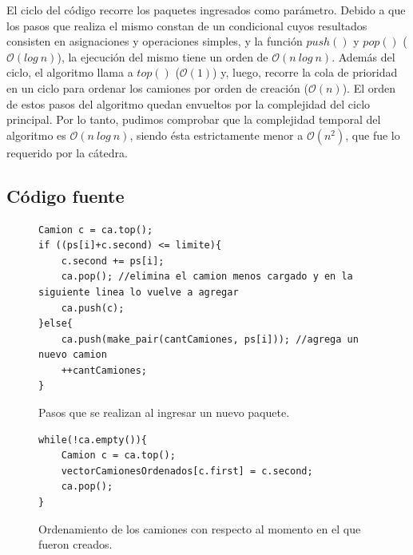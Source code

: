 \newline
El ciclo del código recorre los paquetes ingresados como parámetro. Debido a que los pasos que realiza el mismo constan de un condicional cuyos resultados consisten en asignaciones y operaciones simples, y la función $push()$ y $pop()$ ($\mathcal{O}(log\ n)$), la ejecución del mismo tiene un orden de $\mathcal{O}(n\ log\ n)$.\newline
\newline
Además del ciclo, el algoritmo llama a $top()$ ($\mathcal{O}(1)$\footnotemark[1]) y, luego, recorre la cola de prioridad en un ciclo para ordenar los camiones por orden de creación ($\mathcal{O}(n)$). El orden de estos pasos del algoritmo quedan envueltos por la complejidad del ciclo principal. Por lo tanto, pudimos comprobar que la complejidad temporal del algoritmo es $\mathcal{O}(n\ log\ n)$, siendo ésta estrictamente menor a $\mathcal{O}(n^2)$, que fue lo requerido por la cátedra.

\subsection{Código fuente}

\begin{figure}[H]
\begin{center}
\begin{verbatim}
Camion c = ca.top();
if ((ps[i]+c.second) <= limite){
    c.second += ps[i];
    ca.pop(); //elimina el camion menos cargado y en la siguiente linea lo vuelve a agregar
    ca.push(c);
}else{
    ca.push(make_pair(cantCamiones, ps[i])); //agrega un nuevo camion
    ++cantCamiones;
}
\end{verbatim}
\caption{Pasos que se realizan al ingresar un nuevo paquete.}

\begin{verbatim}
while(!ca.empty()){
	Camion c = ca.top();
	vectorCamionesOrdenados[c.first] = c.second;
	ca.pop();
}
\end{verbatim}
\caption{Ordenamiento de los camiones con respecto al momento en el que fueron creados.}
\end{center}
\end{figure}

